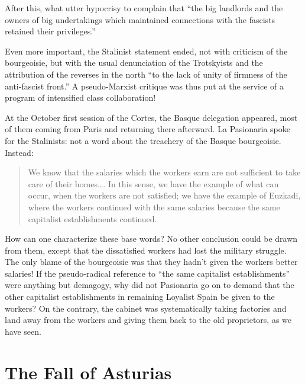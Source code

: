 After this, what utter hypocrisy to complain that ``the big landlords and the owners of big undertakings which maintained connections with the fascists retained their privileges.\kn\kn''

Even more important, the Stalinist statement ended, not with criticism of the bourgeoisie, but with the usual denunciation of the Trotskyists and the attribution of the reverses in the north ``to the lack of unity of firmness of the anti-fascist front.\kn\kn'' A pseudo-Marxist critique was thus put at the service of a program of intensified class collaboration!

At the October first session of the Cortes, the Basque delegation appeared, most of them coming from Paris and returning there afterward. La Pasionaria spoke for the Stalinists: not a word about the treachery of the Basque bourgeoisie. Instead:

\begin{quotation}
  We know that the salaries which the workers earn are not sufficient to take care of their homes\dots. In this sense, we have the example of what can occur, when the workers are not satisfied; we have the example of Euzkadi, where the workers continued with the same salaries because the same capitalist establishments continued.
\end{quotation}

How can one characterize these base words? No other conclusion could be drawn from them, except that the dissatisfied workers had lost the military struggle. The only blame of the bourgeoisie was that they hadn’t given the workers better salaries! If the pseudo-radical reference to ``the same capitalist establishments'' were anything but demagogy, why did not Pasionaria go on to demand that the other capitalist establishments in remaining Loyalist Spain be given to the workers? On the contrary, the cabinet was systematically taking factories and land away from the workers and giving them back to the old proprietors, as we have seen.

\newpage

\section{The Fall of Asturias}

